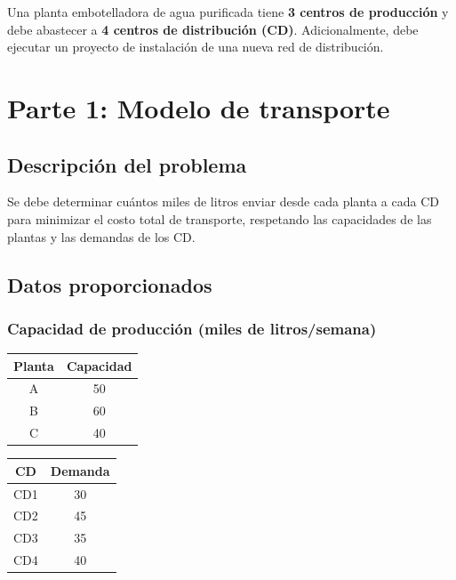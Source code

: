 \documentclass[12pt,a4paper]{article}
\begin{document}
	Una planta embotelladora de agua purificada tiene \textbf{3 centros de producción} y debe abastecer a \textbf{4 centros de distribución (CD)}. Adicionalmente, debe ejecutar un proyecto de instalación de una nueva red de distribución.
	
	\newpage
	
	\section{Parte 1: Modelo de transporte}
	
	\subsection{Descripción del problema}
	
	Se debe determinar cuántos miles de litros enviar desde cada planta a cada CD para minimizar el costo total de transporte, respetando las capacidades de las plantas y las demandas de los CD.
	
	\subsection{Datos proporcionados}
	
	\subsubsection{Capacidad de producción (miles de litros/semana)}
	
	\begin{table}[H]
		\centering
		\begin{tabular}{|c|c|}
			\hline
			\textbf{Planta} & \textbf{Capacidad} \\
			\hline
			A & 50 \\
			B & 60 \\
			C & 40 \\
			\hline
		\end{tabular}
		\hspace{2cm}
		\begin{tabular}{|c|c|}
			\hline
			\textbf{CD} & \textbf{Demanda} \\
			\hline
			CD1 & 30 \\
			CD2 & 45 \\
			CD3 & 35 \\
			CD4 & 40 \\
			\hline
		\end{tabular}
	\end{table}
	
\end{document}
